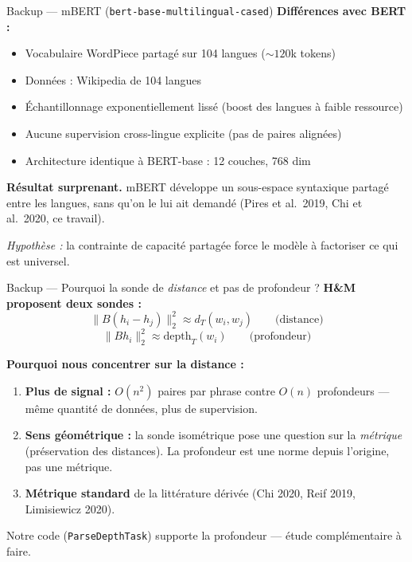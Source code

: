 \documentclass[aspectratio=169,11pt]{beamer}
\begin{document}
\begin{frame}{Backup --- mBERT (\texttt{bert-base-multilingual-cased})}
  \textbf{Différences avec BERT :}
  \begin{itemize}\setlength\itemsep{4pt}
    \item Vocabulaire WordPiece partagé sur \alert{104 langues} ($\sim 120$k tokens)
    \item Données : Wikipedia de 104 langues
    \item Échantillonnage exponentiellement lissé (boost des langues à faible ressource)
    \item \alert{Aucune supervision cross-lingue explicite} (pas de paires alignées)
    \item Architecture identique à BERT-base : 12 couches, 768 dim
  \end{itemize}

  \vspace{0.5cm}
  \textbf{Résultat surprenant.} mBERT développe un \alert{sous-espace
  syntaxique partagé} entre les langues, sans qu'on le lui ait
  demandé (Pires et al.\ 2019, Chi et al.\ 2020, ce travail).

  \vspace{0.3cm}
  \emph{Hypothèse :} la contrainte de capacité partagée force le
  modèle à factoriser ce qui est universel.
\end{frame}

\begin{frame}{Backup --- Pourquoi la sonde de \emph{distance} et pas de profondeur ?}
  \textbf{H\&M proposent deux sondes :}
  \[
    \|B(h_i - h_j)\|_2^2 \approx d_T(w_i, w_j) \qquad \text{(distance)}
  \]
  \[
    \|B h_i\|_2^2 \approx \mathrm{depth}_T(w_i) \qquad \text{(profondeur)}
  \]

  \textbf{Pourquoi nous concentrer sur la distance :}
  \begin{enumerate}\setlength\itemsep{4pt}
    \item \textbf{Plus de signal :} $O(n^2)$ paires par phrase contre
          $O(n)$ profondeurs --- même quantité de données, plus de
          supervision.
    \item \textbf{Sens géométrique :} la sonde isométrique pose une
          question sur la \emph{métrique} (préservation des distances).
          La profondeur est une norme depuis l'origine, pas une métrique.
    \item \textbf{Métrique standard} de la littérature dérivée
          (Chi 2020, Reif 2019, Limisiewicz 2020).
  \end{enumerate}

  \vspace{0.3cm}
  \footnotesize
  Notre code (\texttt{ParseDepthTask}) supporte la profondeur ---
  étude complémentaire à faire.
\end{frame}
\end{document}
